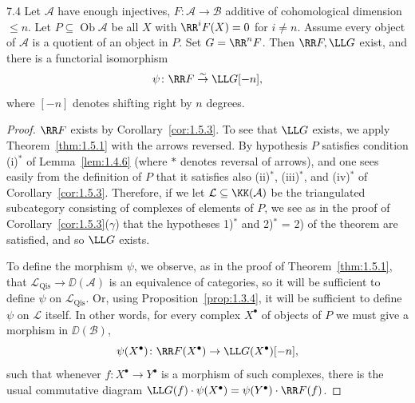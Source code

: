 \begin{bookproposition}{7.4}\label{prop:1.7.4}
Let $\mathcal{A}$ have enough injectives, $F\colon\mathcal{A}\to\mathcal{B}$ additive of cohomological dimension $\le n$.
Let $P\subseteq\operatorname{Ob}\mathcal{A}$ be all $X$ with $\RR^iF(X)=0$ for $i\ne n$.
Assume every object of $\mathcal{A}$ is a quotient of an object in $P$.
Set $G=\RR^nF$. Then $\RR F,\LL G$ exist, and there is a functorial isomorphism
\[
\psi\colon \RR F \stackrel{\sim}{\to} \LL G[-n],
\]
where $[-n]$ denotes shifting right by $n$ degrees.
\end{bookproposition}

\begin{proof}
$\RR F$ exists by Corollary~\ref{cor:1.5.3}.
To see that $\LL G$ exists, we apply Theorem~\ref{thm:1.5.1} with the arrows reversed.
By hypothesis $P$ satisfies condition (i)$^*$ of Lemma~\ref{lem:1.4.6} (where $*$ denotes reversal of arrows), and one sees easily from the definition of $P$ that it satisfies also (ii)$^*$, (iii)$^*$, and (iv)$^*$ of Corollary~\ref{cor:1.5.3}.
Therefore, if we let $\mathcal{L}\subseteq\KK(\mathcal{A})$ be the triangulated subcategory consisting of complexes of elements of $P$, we see as in the proof of Corollary~\ref{cor:1.5.3}($\gamma$) that the hypotheses 1)$^*$ and 2)$^*$ = 2) of the theorem are satisfied, and so $\LL G$ exists.

To define the morphism $\psi$, we observe, as in the proof of Theorem~\ref{thm:1.5.1}, that $\mathcal{L}_{\operatorname{Qis}}\to\DD(\mathcal{A})$ is an equivalence of categories, so it will be sufficient to define $\psi$ on $\mathcal{L}_{\operatorname{Qis}}$. Or, using Proposition~\ref{prop:1.3.4}, it will be sufficient to define $\psi$ on $\mathcal{L}$ itself.
In other words, for every complex $X^\bullet$ of objects of $P$ we must give a morphism in $\DD(\mathcal{B})$,
\[
\psi(X^\bullet)\colon \RR F(X^\bullet)\to \LL G(X^\bullet)[-n],
\]
such that whenever $f\colon X^\bullet\to Y^\bullet$ is a morphism of such complexes, there is the usual commutative diagram
$\LL G(f)\cdot\psi(X^\bullet)=\psi(Y^\bullet)\cdot\RR F(f)$.



\end{proof}
